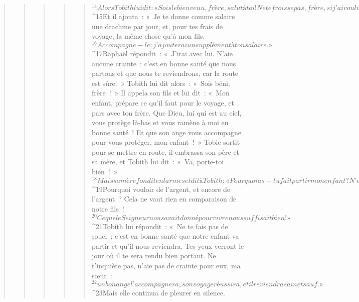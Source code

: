 \begin{verse}
\begin{verse}
\begin{verse}
\begin{verse}
\begin{verse}
${}^{14}Alors Tobith lui dit : « Sois le bienvenu, frère, salut à toi ! Ne te froisse pas, frère, si j’ai voulu connaître la vérité sur ta famille. Il se trouve que tu es mon frère, et que tu es de bonne famille. J’ai connu Ananias et Nathan, les deux fils de Sémélias le Grand ; ils m’accompagnaient autrefois à Jérusalem pour y faire leurs adorations avec moi, et ils ne sont pas tombés dans l’erreur. Tes frères sont des hommes de bien. Tu es de bonne souche. Entre et sois dans la joie ! » 
${}^{15}Et il ajouta : « Je te donne comme salaire une drachme par jour, et, pour tes frais de voyage, la même chose qu’à mon fils. 
${}^{16}Accompagne-le ; j’ajouterai un supplément à ton salaire. » 
${}^{17}Raphaël répondit : « J’irai avec lui. N’aie aucune crainte : c’est en bonne santé que nous partons et que nous te reviendrons, car la route est sûre. » Tobith lui dit alors : « Sois béni, frère ! » Il appela son fils et lui dit : « Mon enfant, prépare ce qu’il faut pour le voyage, et pars avec ton frère. Que Dieu, lui qui est au ciel, vous protège là-bas et vous ramène à moi en bonne santé ! Et que son ange vous accompagne pour vous protéger, mon enfant ! »
      Tobie sortit pour se mettre en route, il embrassa son père et sa mère, et Tobith lui dit : « Va, porte-toi bien ! » 
${}^{18}Mais sa mère fondit en larmes et dit à Tobith : « Pourquoi as-tu fait partir mon enfant ? N’est-il pas le bâton de nos mains, tant qu’il demeure avec nous ? 
${}^{19}Pourquoi vouloir de l’argent, et encore de l’argent ? Cela ne vaut rien en comparaison de notre fils ! 
${}^{20}Ce que le Seigneur nous avait donné pour vivre nous suffisait bien ! » 
${}^{21}Tobith lui répondit : « Ne te fais pas de souci : c’est en bonne santé que notre enfant va partir et qu’il nous reviendra. Tes yeux verront le jour où il te sera rendu bien portant. Ne t’inquiète pas, n’aie pas de crainte pour eux, ma sœur : 
${}^{22}un bon ange l’accompagnera, son voyage réussira, et il reviendra sain et sauf. » 
${}^{23}Mais elle continua de pleurer en silence.
      

\end{verse}
\end{verse}
\end{verse}
\end{verse}
\end{verse}
